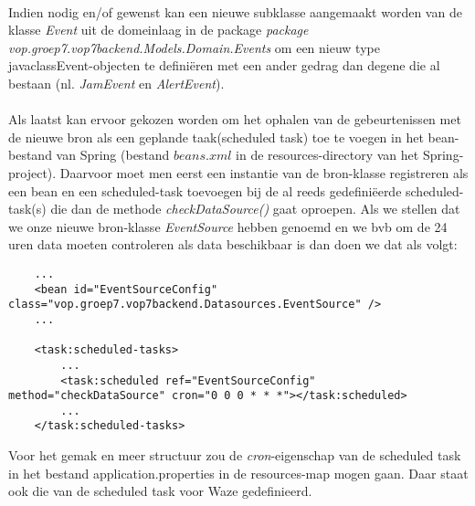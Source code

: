 \documentclass{article}
\newcommand*{\javaclass}[1]{\emph{#1}}
\newcommand*{\javapckg}[1]{\javaclass{#1}}
\newcommand*{\javamethod}[2]{\javaclass{#1(#2)}}
\begin{document}
\paragraph{}Indien nodig en/of gewenst kan een nieuwe subklasse aangemaakt worden van de klasse \javaclass{Event} uit de domeinlaag in de package \javapckg{package vop.groep7.vop7backend.Models.Domain.Events} om een nieuw type javaclass{Event}-objecten te defini\"eren met een ander gedrag dan degene die al bestaan (nl. \javaclass{JamEvent} en \javaclass{AlertEvent}).
\paragraph{}Als laatst kan ervoor gekozen worden om het ophalen van de gebeurtenissen met de nieuwe bron als een geplande taak(scheduled task) toe te voegen in het bean-bestand van Spring (bestand $beans.xml$ in de resources-directory van het Spring-project). Daarvoor moet men eerst een instantie van de bron-klasse registreren als een bean en een scheduled-task toevoegen bij de al reeds gedefini\"eerde scheduled-task(s) die dan de methode \javamethod{checkDataSource}{} gaat oproepen. Als we stellen dat we onze nieuwe bron-klasse  \javaclass{EventSource} hebben genoemd en we bvb om de 24 uren data moeten controleren als data beschikbaar is dan doen we dat als volgt:
\begin{lstlisting}
	...
	<bean id="EventSourceConfig" class="vop.groep7.vop7backend.Datasources.EventSource" />
	...
   
	<task:scheduled-tasks>
		...
		<task:scheduled ref="EventSourceConfig" method="checkDataSource" cron="0 0 0 * * *"></task:scheduled>
		...
	</task:scheduled-tasks>
\end{lstlisting}
Voor het gemak en meer structuur zou de \emph{cron}-eigenschap van de scheduled task in het bestand application.properties in de resources-map mogen gaan. Daar staat ook die van de scheduled task voor Waze gedefinieerd.
\end{document}
